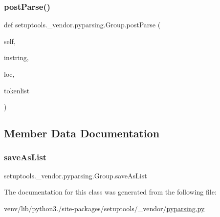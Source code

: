 \subsubsection{\texorpdfstring{post\+Parse()}{postParse()}}
{\footnotesize\ttfamily def setuptools.\+\_\+vendor.\+pyparsing.\+Group.\+post\+Parse (\begin{DoxyParamCaption}\item[{}]{self,  }\item[{}]{instring,  }\item[{}]{loc,  }\item[{}]{tokenlist }\end{DoxyParamCaption})}



\subsection{Member Data Documentation}
\mbox{\label{classsetuptools_1_1__vendor_1_1pyparsing_1_1Group_abb9329fa2f2c5c248c18b80cdd6f39c0}} 
\subsubsection{\texorpdfstring{save\+As\+List}{saveAsList}}
{\footnotesize\ttfamily setuptools.\+\_\+vendor.\+pyparsing.\+Group.\+save\+As\+List}



The documentation for this class was generated from the following file\+:\begin{DoxyCompactItemize}
\item 
venv/lib/python3./site-\/packages/setuptools/\+\_\+vendor/\hyperlink{setuptools_2__vendor_2pyparsing_8py}{pyparsing.\+py}\end{DoxyCompactItemize}
